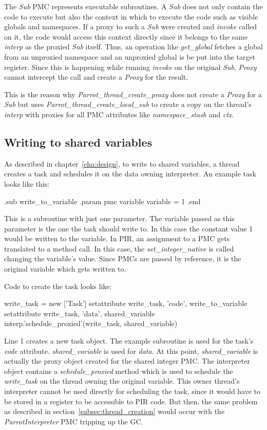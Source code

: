 \documentclass[bachelor,english]{hgbthesis}
\begin{document}
The \textit{Sub} PMC represents executable subroutines. A \textit{Sub} does not only contain the code to execute but also the context in which to execute the code such as visible globals and namespaces. If a proxy to such a \textit{Sub} were created and \textit{invoke} called on it, the code would access this context directly since it belongs to the same \textit{interp} as the proxied \textit{Sub} itself. Thus, an operation like \textit{get\_global} fetches a global from an unproxied namespace and an unproxied global is be put into the target register. Since this is happening while running \textit{invoke} on the original \textit{Sub}, \textit{Proxy} cannot intercept the call and create a \textit{Proxy} for the result.

This is the reason why \textit{Parrot\_thread\_create\_proxy} does not create a \textit{Proxy} for a \textit{Sub} but uses \textit{Parrot\_thread\_create\_local\_sub} to create a copy on the thread's \textit{interp} with proxies for all PMC attributes like \textit{namespace\_stash} and \textit{ctx}.

\subsection{Writing to shared variables}

As described in chapter~\ref{cha:design}, to write to shared variables, a thread creates a task and schedules it on the data owning interpreter. An example task looks like this:
%
\begin{GenericCode}
.sub write_to_variable
    .param pmc variable
    variable = 1
.end
\end{GenericCode}
%
This is a subroutine with just one parameter. The variable passed as this parameter is the one the task should write to. In this case the constant value 1 would be written to the variable. In PIR, an assignment to a PMC gets translated to a method call. In this case, the \textit{set\_integer\_native} is called changing the variable's value. Since PMCs are passed by reference, it is the original variable which gets written to.

Code to create the task looks like:
%
\begin{GenericCode}
    write_task = new ['Task']
    setattribute write_task, 'code', write_to_variable
    setattribute write_task, 'data', shared_variable
    interp.'schedule_proxied'(write_task, shared_variable)
\end{GenericCode}
%
Line 1 creates a new task object. The example subroutine is used for the task's \textit{code} attribute. \textit{shared\_variable} is used for \textit{data}. At this point, \textit{shared\_variable} is actually the proxy object created for the shared integer PMC. The interpreter object contains a \textit{schedule\_proxied} method which is used to schedule the \textit{write\_task} on the thread owning the original variable. This owner thread's interpreter cannot be used directly for scheduling the task, since it would have to be stored in a register to be accessible to PIR code. But then, the same problem as described in section~\ref{subsec:thread_creation} would occur with the \textit{ParrotInterpreter} PMC tripping up the GC.
\end{document}
